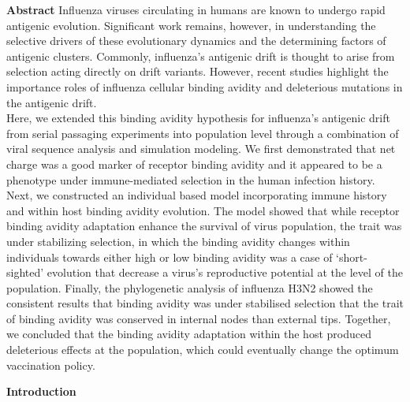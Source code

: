 \documentclass[12pt,a4paper]{article}
\begin{document}
{\bf Abstract}
Influenza viruses circulating in humans are known to undergo rapid antigenic evolution. Significant work remains, however, in understanding the selective drivers of these evolutionary dynamics and the determining factors of antigenic clusters. Commonly, influenza’s antigenic drift is thought to arise from selection acting directly on drift variants. However, recent studies highlight the importance roles of influenza cellular binding avidity and deleterious mutations in the antigenic drift. \\
Here, we extended this binding avidity hypothesis for influenza’s antigenic drift from serial passaging experiments into population level through a combination of viral sequence analysis and simulation modeling. We first demonstrated that net charge was a good marker of receptor binding avidity and it appeared to be a phenotype under immune-mediated selection in the human infection history. Next, we constructed an individual based model incorporating immune history and within host binding avidity evolution. The model showed that while receptor binding avidity adaptation enhance the survival of virus population, the trait was under stabilizing selection, in which the binding avidity changes within individuals towards either high or low binding avidity was a case of ‘short-sighted’ evolution that decrease a virus’s reproductive potential at the level of the population. Finally, the phylogenetic analysis of influenza H3N2 showed the consistent results that binding avidity was under stabilised selection that the trait of binding avidity was conserved in internal nodes than external tips. Together, we concluded that the binding avidity adaptation within the host produced deleterious effects at the population, which could eventually change the optimum vaccination policy.

{\bf Introduction}
\end{document}
